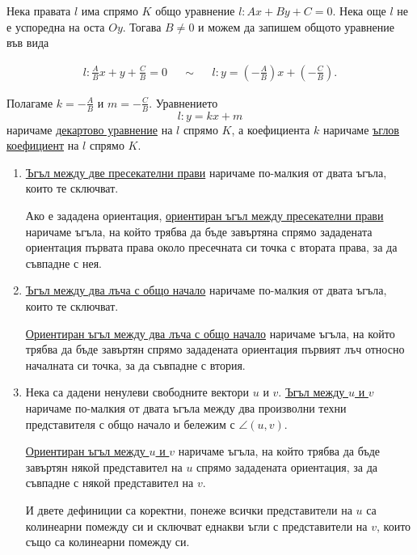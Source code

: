 \documentclass[numbers=endperiod, DIV=15]{scrartcl}
\begin{document}
\begin{definition}
  Нека правата $l$ има спрямо $K$ общо уравнение $l: Ax + By + C = 0$. Нека още $l$ не е успоредна на оста $Oy$. Тогава $B \neq 0$ и можем да запишем общото уравнение във вида

  \begin{align*}
    l: \frac A B x + y + \frac C B = 0
    &&\sim&&
    l: y = \left(-\frac A B \right) x + \left(-\frac C B \right).
  \end{align*}

  Полагаме $k = -\frac A B$ и $m = -\frac C B$. Уравнението
  \begin{displaymath}
    l: y = kx + m
  \end{displaymath}
  наричаме \underline{декартово уравнение} на $l$ спрямо $K$, а коефициента $k$ наричаме \underline{ъглов коефициент} на $l$ спрямо $K$.
\end{definition}

\begin{definition}
  \mbox{}
  \begin{enumerate}
    \item \underline{Ъгъл между две пресекателни прави} наричаме по-малкия от двата ъгъла, които те сключват.

    Ако е зададена ориентация, \underline{ориентиран ъгъл между пресекателни прави} наричаме ъгъла, на който трябва да бъде завъртяна спрямо зададената ориентация първата права около пресечната си точка с втората права, за да съвпадне с нея.

    \item \underline{Ъгъл между два лъча с общо начало} наричаме по-малкия от двата ъгъла, които те сключват.

    \underline{Ориентиран ъгъл между два лъча с общо начало} наричаме ъгъла, на който трябва да бъде завъртян спрямо зададената ориентация първият лъч относно началната си точка, за да съвпадне с втория.

    \item Нека са дадени ненулеви свободните вектори $u$ и $v$. \underline{Ъгъл между $u$ и $v$} наричаме по-малкия от двата ъгъла между два произволни техни представителя с общо начало и бележим с $\angle(u, v)$.

    \underline{Ориентиран ъгъл между $u$ и $v$} наричаме ъгъла, на който трябва да бъде завъртян някой представител на $u$ спрямо зададената ориентация, за да съвпадне с някой представител на $v$.

    И двете дефиниции са коректни, понеже всички представители на $u$ са колинеарни помежду си и сключват еднакви ъгли с представители на $v$, които също са колинеарни помежду си.
  \end{enumerate}
\end{definition}
\end{document}
